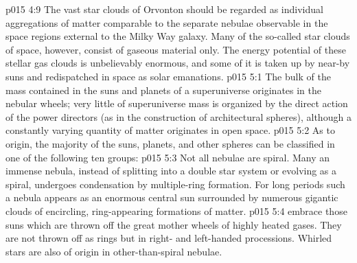 \vs p015 4:9 The vast star clouds of Orvonton should be regarded as individual aggregations of matter comparable to the separate nebulae observable in the space regions external to the Milky Way galaxy. Many of the so\hyp{}called star clouds of space, however, consist of gaseous material only. The energy potential of these stellar gas clouds is unbelievably enormous, and some of it is taken up by near\hyp{}by suns and redispatched in space as solar emanations.
\vs p015 5:1 The bulk of the mass contained in the suns and planets of a superuniverse originates in the nebular wheels; very little of superuniverse mass is organized by the direct action of the power directors (as in the construction of architectural spheres), although a constantly varying quantity of matter originates in open space.
\vs p015 5:2 As to origin, the majority of the suns, planets, and other spheres can be classified in one of the following ten groups:
\vs p015 5:3 \bibnobreakspace {} Not all nebulae are spiral. Many an immense nebula, instead of splitting into a double star system or evolving as a spiral, undergoes condensation by multiple\hyp{}ring formation. For long periods such a nebula appears as an enormous central sun surrounded by numerous gigantic clouds of encircling, ring\hyp{}appearing formations of matter.
\vs p015 5:4 \bibnobreakspace {} embrace those suns which are thrown off the great mother wheels of highly heated gases. They are not thrown off as rings but in right\hyp{} and left\hyp{}handed processions. Whirled stars are also of origin in other\hyp{}than\hyp{}spiral nebulae.
